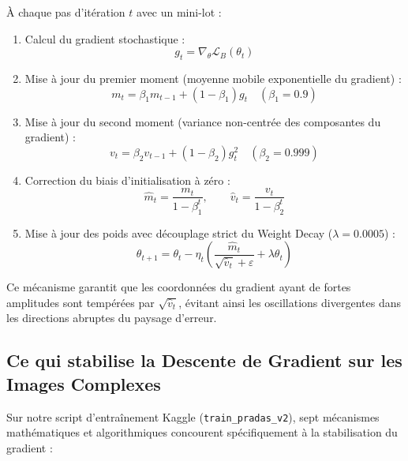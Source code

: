 \documentclass[11pt,a4paper]{article}
\begin{document}
\begin{tcolorbox}[colback=white, colframe=pradasblue, title=Algorithme : Optimiseur AdamW dans PRADAS]
À chaque pas d'itération $t$ avec un mini-lot :
\begin{enumerate}
    \item Calcul du gradient stochastique :
    \begin{equation}
        g_t = \nabla_\theta \mathcal{L}_B(\theta_t)
    \end{equation}
    \item Mise à jour du premier moment (moyenne mobile exponentielle du gradient) :
    \begin{equation}
        m_t = \beta_1 m_{t-1} + (1 - \beta_1) g_t \quad (\beta_1 = 0.9)
    \end{equation}
    \item Mise à jour du second moment (variance non-centrée des composantes du gradient) :
    \begin{equation}
        v_t = \beta_2 v_{t-1} + (1 - \beta_2) g_t^2 \quad (\beta_2 = 0.999)
    \end{equation}
    \item Correction du biais d'initialisation à zéro :
    \begin{equation}
        \hat{m}_t = \frac{m_t}{1 - \beta_1^t}, \qquad \hat{v}_t = \frac{v_t}{1 - \beta_2^t}
    \end{equation}
    \item Mise à jour des poids avec découplage strict du Weight Decay ($\lambda = 0.0005$) :
    \begin{equation}
        \theta_{t+1} = \theta_t - \eta_t \left( \frac{\hat{m}_t}{\sqrt{\hat{v}_t} + \varepsilon} + \lambda \theta_t \right)
    \end{equation}
\end{enumerate}
\end{tcolorbox}

Ce mécanisme garantit que les coordonnées du gradient ayant de fortes amplitudes sont tempérées par $\sqrt{\hat{v}_t}$, évitant ainsi les oscillations divergentes dans les directions abruptes du paysage d'erreur.

\subsection{Ce qui stabilise la Descente de Gradient sur les Images Complexes}
Sur notre script d'entraînement Kaggle (\texttt{train\_pradas\_v2}), sept mécanismes mathématiques et algorithmiques concourent spécifiquement à la stabilisation du gradient :
\end{document}
